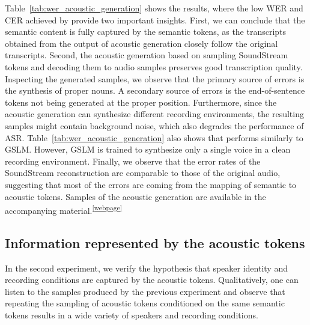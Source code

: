 \documentclass[letterpaper,10 pt]{IEEEtran}
\begin{document}
Table~\ref{tab:wer_acoustic_generation} shows the results, where the low WER and CER achieved by \ours{} provide two important insights. First, we can conclude that the semantic content is fully captured by the semantic tokens, as the transcripts obtained from the output of acoustic generation closely follow the original transcripts. Second, the acoustic generation based on sampling SoundStream tokens and decoding them to audio samples preserves good transcription quality. Inspecting the generated samples, we observe that the primary source of errors is the synthesis of proper nouns. A secondary source of errors is the end-of-sentence tokens not being generated at the proper position. Furthermore, since the acoustic generation can synthesize different recording environments, the resulting samples might contain background noise, which also degrades the performance of ASR. Table~\ref{tab:wer_acoustic_generation} also shows that \ours{} performs similarly to GSLM. However, GSLM is trained to synthesize only a single voice in a clean recording environment. Finally, we observe that the error rates of the SoundStream reconstruction are comparable to those of the original audio, suggesting that most of the errors are coming from the mapping of semantic to acoustic tokens. Samples of the acoustic generation are available in the accompanying material.\textsuperscript{\ref{webpage}}

\subsection{Information represented by the acoustic tokens} \label{sec:exp-acoustic}

In the second experiment, we verify the hypothesis that speaker identity and recording conditions are captured by the acoustic tokens. Qualitatively, one can listen to the samples produced by the previous experiment and observe that repeating the sampling of acoustic tokens conditioned on the same semantic tokens results in a wide variety of speakers and recording conditions. 
\end{document}
